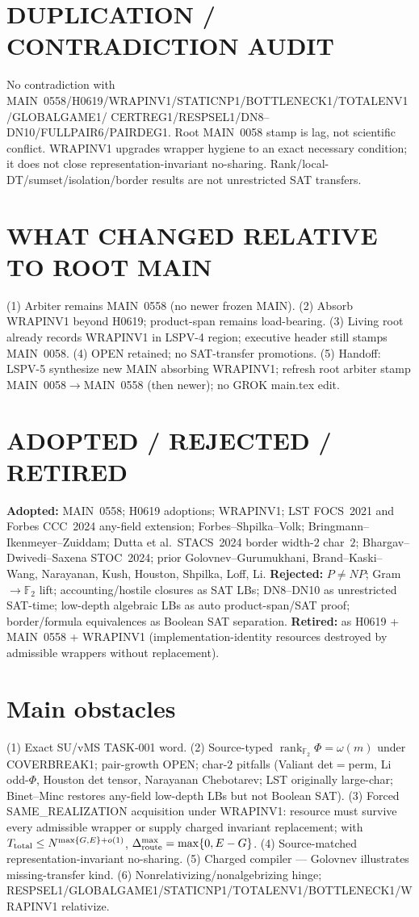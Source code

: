 \documentclass[11pt]{article}
\begin{document}
\section*{DUPLICATION / CONTRADICTION AUDIT}
No contradiction with MAIN~0558/H0619/WRAPINV1/STATICNP1/BOTTLENECK1/TOTALENV1/GLOBALGAME1/
CERTREG1/RESPSEL1/DN8--DN10/FULLPAIR6/PAIRDEG1. Root MAIN~0058 stamp is lag, not scientific
conflict. WRAPINV1 upgrades wrapper hygiene to an exact necessary condition; it does not
close representation-invariant no-sharing. Rank/local-DT/sumset/isolation/border results are
not unrestricted SAT transfers.

\section*{WHAT CHANGED RELATIVE TO ROOT MAIN}
(1) Arbiter remains MAIN~0558 (no newer frozen MAIN). (2) Absorb WRAPINV1 beyond H0619;
product-span remains load-bearing. (3) Living root already records WRAPINV1 in LSPV-4 region;
executive header still stamps MAIN~0058. (4) OPEN retained; no SAT-transfer promotions.
(5) Handoff: LSPV-5 synthesize new MAIN absorbing WRAPINV1; refresh root arbiter stamp
MAIN~0058$\to$MAIN~0558 (then newer); no GROK main.tex edit.

\section*{ADOPTED / REJECTED / RETIRED}
\textbf{Adopted:} MAIN~0558; H0619 adoptions; WRAPINV1; LST FOCS~2021 and Forbes CCC~2024 any-field
extension; Forbes--Shpilka--Volk; Bringmann--Ikenmeyer--Zuiddam; Dutta et al.\ STACS~2024
border width-$2$ char~$2$; Bhargav--Dwivedi--Saxena STOC~2024; prior Golovnev--Gurumukhani,
Brand--Kaski--Wang, Narayanan, Kush, Houston, Shpilka, Loff, Li.
\textbf{Rejected:} $P\neq NP$; Gram$\to\mathbb F_2$ lift; accounting/hostile closures as SAT LBs;
DN8--DN10 as unrestricted SAT-time; low-depth algebraic LBs as auto product-span/SAT proof;
border/formula equivalences as Boolean SAT separation.
\textbf{Retired:} as H0619 + MAIN~0558 + WRAPINV1 (implementation-identity resources destroyed
by admissible wrappers without replacement).

\section*{Main obstacles}
(1) Exact SU/vMS TASK-001 word. (2) Source-typed
$\operatorname{rank}_{\mathbb F_2}\Phi=\omega(m)$ under COVERBREAK1; pair-growth OPEN;
char-$2$ pitfalls (Valiant det$=$perm, Li odd-$\Phi$, Houston det tensor, Narayanan Chebotarev;
LST originally large-char; Binet--Minc restores any-field low-depth LBs but not Boolean SAT).
(3) Forced SAME\_REALIZATION acquisition under WRAPINV1: resource must survive every
admissible wrapper or supply charged invariant replacement; with
$T_{\rm total}\le N^{\max\{G,E\}+o(1)}$, $\Delta_{\rm route}^{\max}=\max\{0,E-G\}$.
(4) Source-matched representation-invariant no-sharing. (5) Charged compiler --- Golovnev
illustrates missing-transfer kind. (6) Nonrelativizing/nonalgebrizing hinge;
RESPSEL1/GLOBALGAME1/STATICNP1/TOTALENV1/BOTTLENECK1/WRAPINV1 relativize.
\end{document}
